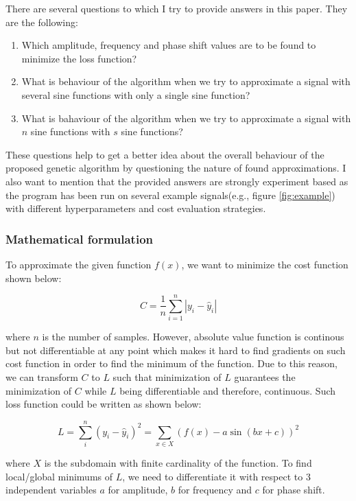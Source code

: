 \documentclass[conference]{IEEEtran}
\begin{document}
There are several questions to which I try to provide answers in this paper. They are the following:

\begin{enumerate}
	\item Which amplitude, frequency and phase shift values are to be found to minimize the loss function?
	\item What is behaviour of the algorithm when we try to approximate a signal with several sine functions with only a single sine function?
	\item What is bahaviour of the algorithm when we try to approximate a signal with $n$ sine functions with $s$ sine functions?
\end{enumerate}

These questions help to get a better idea about the overall behaviour of the proposed genetic algorithm by questioning the nature of found approximations. I also want to mention that the provided answers 
are strongly experiment based as the program has been run on several example signals(e.g., figure \ref{fig:example}) with different hyperparameters and cost evaluation strategies.

\subsubsection{Mathematical formulation}
To approximate the given function $f(x)$, we want to minimize the cost function shown below:

\begin{equation}
	C = \frac{1}{n} \sum_{i=1}^{n} |y_i-\hat{y}_i|
	\label{eq:cost}
\end{equation}

where $n$ is the number of samples. However, absolute value function is continous but not differentiable at any point which makes it hard to find gradients on such cost function in order to find 
the minimum of the function. Due to this reason, we can transform $C$ to $L$ such that minimization of $L$ guarantees the minimization of $C$ while $L$ being differentiable and therefore, continuous. 
Such loss function could be written as shown below:

\begin{equation}
	L = \sum_{i}^{n} (y_i-\hat{y}_i)^2 = \sum_{x \in X}^{} (f(x)-a\sin(bx+c))^2
	\label{eq:loss}
\end{equation}

where $X$ is the subdomain with finite cardinality of the function. To find local/global minimums of $L$, we need to differentiate it with respect to 3 independent variables $a$ for amplitude, $b$ for 
frequency and $c$ for phase shift.
\end{document}
